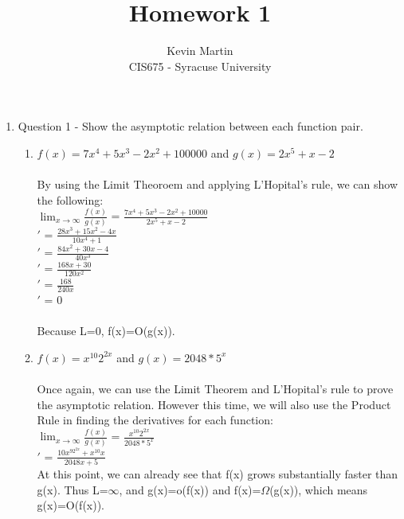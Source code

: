 \documentclass{article}
\author{Kevin Martin\\ CIS675 - Syracuse University}
\title{Homework 1}
\begin{document}
\maketitle
\begin{enumerate}
    \item Question 1 - Show the asymptotic relation between each function pair.
  \begin{enumerate}
    \item \(f(x)=7x^4+5x^3-2x^2+100000\) and \(g(x)=2x^5+x-2\)\\\\
      By using the Limit Theoroem and applying L'Hopital's rule, we can show the following:\\
      $\displaystyle \lim_{x\to \infty} \frac{f(x)}{g(x)}$ = \( \frac{7x^4+5x^3-2x^2+10000}{2x^5+x-2}\)\\
     $\prime$ = \(\frac{28x^3+15x^2-4x}{10x^4+1}\)\\
      $\prime$ = \(\frac{84x^2+30x-4}{40x^3}\)\\
      $\prime$ = \(\frac{168x+30}{120x^2}\)\\
      $\prime$ = \(\frac{168}{240x}\)\\
      $\prime$ = 0\\\\
      Because L=0, f(x)=O(g(x)).\\
    \item \(f(x)=x^{10}2^{2x}\) and \(g(x)=2048*5^x\)\\\\
    Once again, we can use the Limit Theorem and L'Hopital's rule to prove the asymptotic relation. However this time,
      we will also use the Product Rule in finding the derivatives for each function:\\
      $\displaystyle \lim_{x\to \infty} \frac{f(x)}{g(x)}$ = \( \frac{x^{10}2^{2x}}{2048*5^x}\)\\
      $\prime$ = $\frac {10x^92^{2x}+x^10x} {2048x + 5}$\\
      At this point, we can already see that f(x) grows substantially faster than g(x). Thus L=$\infty$, and 
      g(x)=o(f(x)) and f(x)=$\Omega$(g(x)), which means g(x)=O(f(x)).



\end{enumerate}
\end{enumerate}
\end{document}

